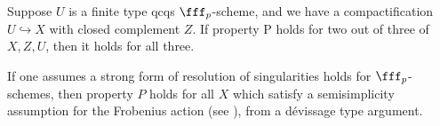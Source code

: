 \begin{lemma}
Suppose $U$ is a finite type qcqs $\fff_p$-scheme, and we have a compactification $U\hookrightarrow X$ with closed complement $Z$.  If property P holds for two out of three of $X,Z,U$, then it holds for all three.
\end{lemma}
If one assumes a strong form of resolution of singularities holds for $\fff_p$-schemes, then property $P$ holds for all $X$ which satisfy a semisimplicity assumption for the Frobenius action (see \cite{geisser2005arithmetic}), from a d\'{e}vissage type argument.



\newpage
\printbibliography


